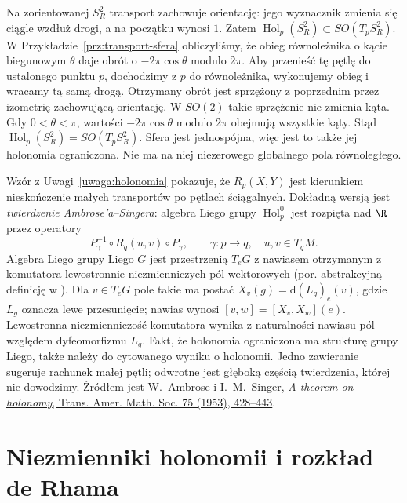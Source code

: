 \begin{przyklad}
\label{prz:holonomia-sfera}
Na zorientowanej $S_R^2$ transport zachowuje orientację:
jego wyznacznik zmienia się ciągle wzdłuż drogi,
a na początku wynosi $1$. Zatem
$\operatorname{Hol}_p(S_R^2)\subset SO(T_pS_R^2)$.
W Przykładzie~\ref{prz:transport-sfera} obliczyliśmy,
że obieg równoleżnika o kącie biegunowym $\theta$ daje obrót
o $-2\pi\cos\theta$ modulo $2\pi$. Aby przenieść tę
pętlę do ustalonego punktu $p$, dochodzimy z $p$ do
równoleżnika, wykonujemy obieg i wracamy tą samą drogą.
Otrzymany obrót jest sprzężony z poprzednim przez
izometrię zachowującą orientację. W $SO(2)$ takie
sprzężenie nie zmienia kąta. Gdy $0<\theta<\pi$,
wartości $-2\pi\cos\theta$ modulo $2\pi$ obejmują
wszystkie kąty. Stąd
$\operatorname{Hol}_p(S_R^2)=SO(T_pS_R^2)$.
Sfera jest jednospójna, więc jest to także jej
holonomia ograniczona. Nie ma na niej niezerowego
globalnego pola równoległego.
\end{przyklad}

\begin{uwaga}
\label{uwaga:ambrose-singer-holonomia}
Wzór z Uwagi~\ref{uwaga:holonomia} pokazuje, że
$R_p(X,Y)$ jest kierunkiem nieskończenie małych
transportów po pętlach ściągalnych. Dokładną wersją
jest \emph{twierdzenie Ambrose'a--Singera}:
algebra Liego grupy $\operatorname{Hol}^0_p$ jest
rozpięta nad $\R$ przez operatory
\[
 P_\gamma^{-1}\circ R_q(u,v)\circ P_\gamma,
 \qquad \gamma:p\longrightarrow q,\quad
 u,v\in T_qM.
\]
Algebra Liego grupy Liego $G$ jest przestrzenią $T_eG$
z nawiasem otrzymanym z komutatora lewostronnie
niezmienniczych pól wektorowych (por. abstrakcyjną definicję
w ).
Dla $v\in T_eG$ pole takie ma postać
$X_v(g)=\mathrm d(L_g)_e(v)$, gdzie $L_g$ oznacza
lewe przesunięcie; nawias wynosi $[v,w]=[X_v,X_w](e)$.
Lewostronna niezmienniczość komutatora wynika z naturalności
nawiasu pól względem dyfeomorfizmu $L_g$.
Fakt, że holonomia ograniczona ma
strukturę grupy Liego, także należy do cytowanego
wyniku o holonomii. Jedno zawieranie sugeruje rachunek małej
pętli; odwrotne jest głęboką częścią twierdzenia, której
nie dowodzimy. Źródłem jest
\href{https://doi.org/10.1090/S0002-9947-1953-0063739-1}
{W.~Ambrose i I.~M.~Singer, \emph{A theorem on holonomy},
Trans. Amer. Math. Soc. 75 (1953), 428--443}.
\end{uwaga}

\section{Niezmienniki holonomii i rozkład de Rhama}
\label{sec:rozklad-de-rhama}

